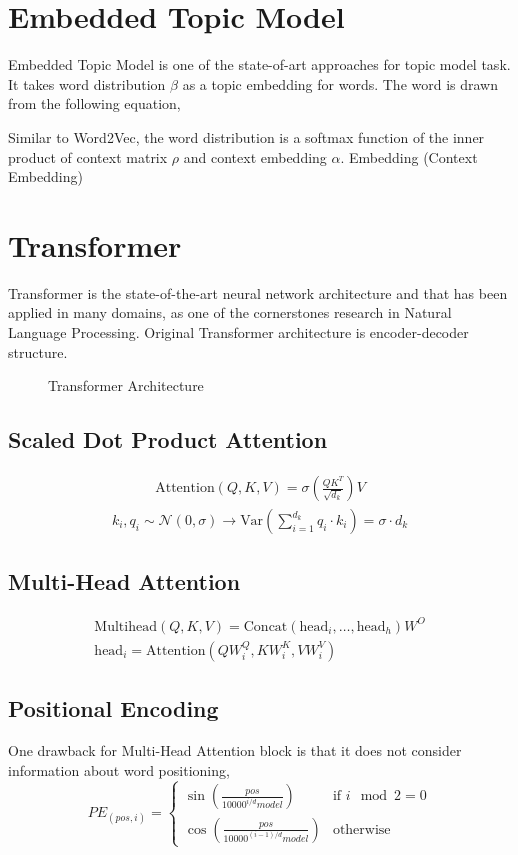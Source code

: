 \section{Embedded Topic Model}
Embedded Topic Model is one of the state-of-art approaches for topic model task. It takes word distribution $ \beta $ as a topic embedding for words. The word is drawn from the following equation,

Similar to Word2Vec, the word distribution is a softmax function of the inner product of context matrix $ \rho $ and context embedding $ \alpha $.
Embedding (Context Embedding)
\section{Transformer}
Transformer is the state-of-the-art neural network architecture and that has been applied in many domains, as one of the cornerstones research in Natural Language Processing. Original Transformer architecture is encoder-decoder structure. 
\begin{figure}
\caption{Transformer Architecture}
\label{fig:transformer}
\end{figure}
\subsection{Scaled Dot Product Attention}
\begin{align*}
\text{Attention}(Q,K,V) = \sigma\left(\frac{QK^T}{\sqrt{d_k}}\right)V
\end{align*}
\begin{align*}
k_i, q_i\sim\mathcal{N}(0,\sigma)\rightarrow\text{Var}\left(\sum_{i=1}^{d_k}q_i\cdot k_i\right)=\sigma\cdot d_k
\end{align*}
\subsection{Multi-Head Attention}
\begin{align*}
\text{Multihead}(Q,K,V)=\text{Concat}(\text{head}_i,\dots,\text{head}_h)W^O \\
\text{head}_i = \text{Attention}(QW_i^{Q}, KW_i^K,VW_i^V)
\end{align*}
\subsection{Positional Encoding}
One drawback for Multi-Head Attention block is that it does not consider information about word positioning, 
\[ PE_{(pos,i)} = \begin{cases} 
\sin\left(\frac{pos}{10000^{i/d}model}\right) & \text{if }i \mod 2 = 0 \\
\cos\left(\frac{pos}{10000^{(i-1)/d}model}\right) & \text{otherwise}
       \end{cases}
    \]